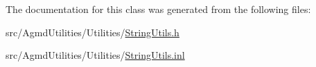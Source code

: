 The documentation for this class was generated from the following files\+:\begin{DoxyCompactItemize}
\item 
src/\+Agmd\+Utilities/\+Utilities/\hyperlink{_string_utils_8h}{String\+Utils.\+h}\item 
src/\+Agmd\+Utilities/\+Utilities/\hyperlink{_string_utils_8inl}{String\+Utils.\+inl}\end{DoxyCompactItemize}
